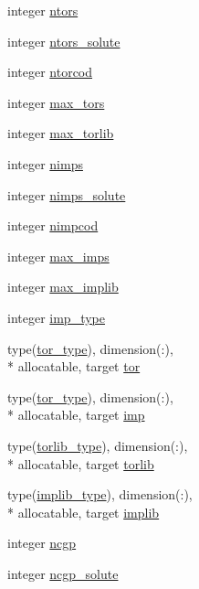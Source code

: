 \begin{DoxyCompactItemize}
integer \hyperlink{classtopo_abe9f7f9ff31ba9e2bf07d57eba011599}{ntors}
\item 
integer \hyperlink{classtopo_aec92d2102078e497ee2a6d2fa66bce7c}{ntors\-\_\-solute}
\item 
integer \hyperlink{classtopo_a78b13d042014360bfeba5ccbc35d0bd0}{ntorcod}
\item 
integer \hyperlink{classtopo_ad15d0e0210d29b89c0da05c40a32f66e}{max\-\_\-tors}
\item 
integer \hyperlink{classtopo_adb758dbc842950b17c7940a435fd501e}{max\-\_\-torlib}
\item 
integer \hyperlink{classtopo_a316b9321482ea8b4d578dce01da31d9e}{nimps}
\item 
integer \hyperlink{classtopo_a92c8927aae134648de67450ea59d3471}{nimps\-\_\-solute}
\item 
integer \hyperlink{classtopo_a482e71c286dc7f192d4b77e7b7371bfc}{nimpcod}
\item 
integer \hyperlink{classtopo_a1b4325f0531a3b008f1ce6b7e30aa825}{max\-\_\-imps}
\item 
integer \hyperlink{classtopo_a13e46089a183300ca9545d432d1b069a}{max\-\_\-implib}
\item 
integer \hyperlink{classtopo_a3e704a6de4b91501a168a1bfa7971824}{imp\-\_\-type}
\item 
type(\hyperlink{structtopo_1_1tor__type}{tor\-\_\-type}), dimension(\-:), \\*
allocatable, target \hyperlink{classtopo_ae6ee33b8bdbc8bdccb2419ed9fda07a6}{tor}
\item 
type(\hyperlink{structtopo_1_1tor__type}{tor\-\_\-type}), dimension(\-:), \\*
allocatable, target \hyperlink{classtopo_ac57046f9ffb42c26a980df689e49fa21}{imp}
\item 
type(\hyperlink{structtopo_1_1torlib__type}{torlib\-\_\-type}), dimension(\-:), \\*
allocatable, target \hyperlink{classtopo_ad251840e17aa9a480795470371c954f1}{torlib}
\item 
type(\hyperlink{structtopo_1_1implib__type}{implib\-\_\-type}), dimension(\-:), \\*
allocatable, target \hyperlink{classtopo_a5137a466e7383aab3d7d0c1a25ba0a21}{implib}
\item 
integer \hyperlink{classtopo_a17bb91c0e550e12c6bfddf5de414489a}{ncgp}
\item 
integer \hyperlink{classtopo_a3a5a2e36d89c3dd5715b85c9d074aad7}{ncgp\-\_\-solute}
\item 

\end{DoxyCompactItemize}
